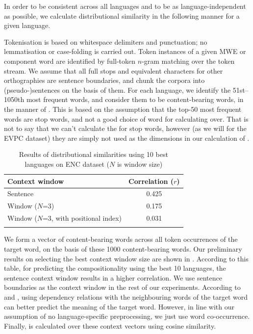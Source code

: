 \documentclass[output=paper
,modfonts
,nonflat]{langsci/langscibook}
\begin{document}
In order to be consistent across all languages and to be as
language-independent as possible, we calculate distributional
similarity in the following manner for a given language.

Tokenisation is based on whitespace delimiters and punctuation; no
lemmatisation or case-folding is carried out. Token instances of a
given MWE or component word are identified by full-token $n$-gram
matching over the token stream. We assume that all full stops and
equivalent characters for other orthographies are sentence boundaries,
and chunk the corpora into (pseudo-)sentences on the basis of
them. For each language, we identify the 51st--1050th most frequent
words, and consider them to be content-bearing words, in the manner of
\citet{Schutze:1997}. This is based on the assumption that the top-50
most frequent words are stop words, and not a good choice of word for
calculating  over. That is not to say that we
can't calculate the  for stop words, however
(as we will for the EVPC dataset) they are simply not used as the
dimensions in our calculation of .

\begin{table}[t]
\begin{center}
\begin{tabular}{l c} 
\lsptoprule
Context window &Correlation ($r$) \\\midrule
Sentence & 0.425 \\
Window ($N$=3) & 0.175 \\
Window ($N$=3, with positional index) & 0.031 \\
\lspbottomrule
\end{tabular}
\caption{\label{tab:ds:premResult} Results of distributional similarities using 10 best languages on ENC dataset ($N$ is window size)}
\end{center}
\end{table}


We form a vector of content-bearing words across all token occurrences
of the target word, on the basis of these 1000 content-bearing words. Our
preliminary results on selecting the best context window size are
shown in . According to this table, for
predicting the compositionality using the best 10 languages, the
sentence context window results in a higher correlation. We use
sentence boundaries as the context window in the rest of our
experiments. According to \citet{weeds2003} and
\citet{Pado:Lapata:2007}, using dependency relations with the
neighbouring words of the target word can better predict the meaning
of the target word. However, in line with our assumption of no
language-specific preprocessing, we just use word
co-occurrence. Finally,  is calculated over
these context vectors using cosine similarity.
\end{document}
